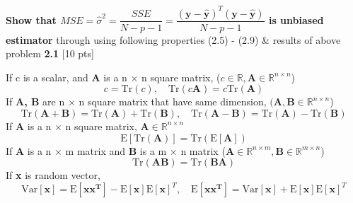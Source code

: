 \documentclass{homework}
\begin{document}
        \textbf{Show that $MSE = \hat{\sigma}^2 = \dfrac{SSE}{N-p-1} = \dfrac{(\mathbf{y-\hat{y}})^T(\mathbf{y-\hat{y}})}{N-p-1} $ is unbiased estimator} through using following properties (2.5) - (2.9) \& results of above problem \textbf{2.1} [10 pts]
    
    \vspace{3mm}
    
    If c is a scalar, and \textbf{A} is a n $\times$ n square matrix,  ($c \in \mathbb{R}, \mathbf{A} \in \mathbb{R}^{n \times n}$)
    \begin{equation}
    c = \text{Tr}(c),
    \quad
    \text{Tr}(c\mathbf{A}) = c\text{Tr}(\mathbf{A}) 
    \end{equation}
    \vspace{3mm}
    If \textbf{A, B} are n $\times$ n square matrix that have same dimension, $(\mathbf{A, B} \in \mathbb{R}^{n \times n}$)
    \begin{equation}
    \text{Tr}(\mathbf{A+B}) = \text{Tr}(\mathbf{A}) + \text{Tr}(\mathbf{B}),
    \quad
    \text{Tr}(\mathbf{A-B}) = \text{Tr}(\mathbf{A}) - \text{Tr}(\mathbf{B})
    \end{equation}
    \vspace{3mm}
    If \textbf{A} is a n $\times$ n square matrix, $\textbf{A} \in \mathbb{R}^{n\times n}$
    \begin{equation}
    \text{E}[\text{Tr}(\textbf{A})] = \text{Tr}(\text{E}[\textbf{A}]) 
    \end{equation}
    \vspace{3mm}
    If \textbf{A} is a n $\times$ m matrix and \textbf{B} is a m $\times$ n matrix ($\textbf{A} \in \mathbb{R}^{n\times m}, \textbf{B} \in \mathbb{R}^{m\times n}$)
    \begin{equation}
    \text{Tr}(\textbf{AB})= \text{Tr}(\textbf{BA}) 
    \end{equation}
    \vspace{3mm}
    If \textbf{x} is random vector,
    \begin{equation}
    \text{Var}[\mathbf{x}] = \text{E}[\mathbf{xx^T}] - \text{E}[\mathbf{x}]\text{E}[\mathbf{x}]^T,
    \quad
    \text{E}[\mathbf{xx^T}] = \text{Var}[\mathbf{x}] + \text{E}[\mathbf{x}]\text{E}[\mathbf{x}]^T
    \end{equation}
    
\end{document}
